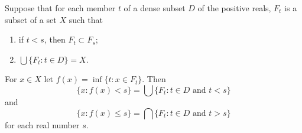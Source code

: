 Suppose that for each member $t$ of a dense subset $D$ of the positive reals, $F_t$ is a subset of a set $X$ such that
\begin{enumerate}
\item[(a)] if $t < s$, then $F_t \subset F_s$;
\item[(b)] $\bigcup \{F_t : t \in D\} = X$.
\end{enumerate}
For $x \in X$ let $f(x) = \inf \{t : x \in F_t\}$. Then
$$\{x : f(x) < s\} = \bigcup \{F_t : t \in D \text{ and } t < s\}$$
and
$$\{x : f(x) \leq s\} = \bigcap \{F_t : t \in D \text{ and } t > s\}$$
for each real number $s$.
